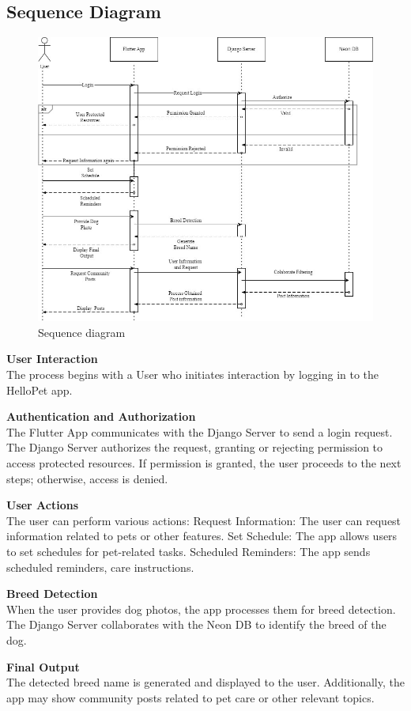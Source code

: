 \subsection{Sequence Diagram}
\vspace{2cm}
\begin{figure}[H]
\centering
\includegraphics[width=1.01\linewidth]{img/sequencial_diagram.jpg}
\caption{Sequence diagram}
\label{fig:activity-user}
\end{figure}
    \noindent\textbf{User Interaction}\\
        The process begins with a User who initiates interaction by logging in to the HelloPet app.

    \noindent\textbf{Authentication and Authorization}\\
        The Flutter App communicates with the Django Server to send a login request.
        The Django Server authorizes the request, granting or rejecting permission to access protected resources.
        If permission is granted, the user proceeds to the next steps; otherwise, access is denied.

    \noindent\textbf{User Actions}\\
        The user can perform various actions:
            Request Information: The user can request information related to pets or other features.
            Set Schedule: The app allows users to set schedules for pet-related tasks.
            Scheduled Reminders: The app sends scheduled reminders,  care instructions.

    \noindent\textbf{Breed Detection}\\
        When the user provides dog photos, the app processes them for breed detection.
        The Django Server collaborates with the Neon DB to identify the breed of the dog.

    \noindent\textbf{Final Output}\\
        The detected breed name is generated and displayed to the user.
        Additionally, the app may show community posts related to pet care or other relevant topics.